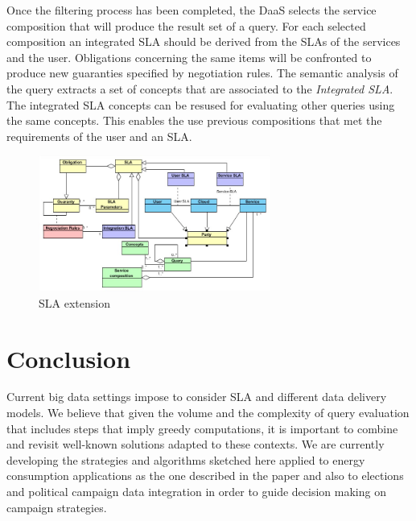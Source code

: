 \documentclass[10pt, conference, compsocconf]{IEEEtran}
\begin{document}
Once the filtering process has been completed, the DaaS selects the service composition that will produce the  result set of a query. 
For each selected composition an integrated SLA should be derived from the SLAs of the services and the user. 
Obligations concerning the same items will be confronted to produce  new guaranties specified by  negotiation rules. 
The semantic analysis of the query extracts a set of concepts that are associated to the  \textit{Integrated SLA}. 
The integrated SLA concepts can be resused for evaluating other  queries using  the same concepts. This enables the use previous compositions that  met the requirements of the user  and an SLA.
\begin{figure}[!t]
\centering
\includegraphics[width=3in]{figs/SLAexetension.jpg}
\caption{SLA extension}
\label{fig_integ}
\end{figure}



\section{Conclusion}
Current big data settings impose  to consider SLA and different data delivery models. 
We believe that given the volume and the complexity of query evaluation that includes steps that imply greedy computations, it is important to combine and revisit well-known solutions  adapted to these contexts. 
We are currently developing the strategies and algorithms sketched here applied to energy consumption applications as the one described in the paper and also to elections and political campaign data integration in order to guide decision making on campaign strategies.
\end{document}
